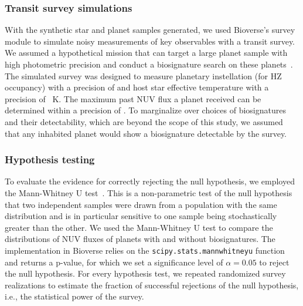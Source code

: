 \documentclass[twocolumn,twocolappendix,linenumbers]{aastex631}
\begin{document}
\subsubsection{Transit survey simulations}
With the synthetic star and planet samples generated, we used Bioverse's survey module to simulate noisy measurements of key observables with a transit survey.
We assumed a hypothetical mission that can target a large planet sample with high photometric precision and conduct a biosignature search on these planets~\citep[e.g.,][]{Apai2019,Apai2022}.
The simulated survey was designed to measure planetary instellation (for \gls{HZ} occupancy) with a precision of  and host star effective temperature with a precision of ~K.
The maximum past \gls{NUV} flux a planet received can be determined within a precision of .
To marginalize over choices of biosignatures and their detectability, which are beyond the scope of this study, we assumed that any inhabited planet would show a biosignature detectable by the survey.


\subsubsection{Hypothesis testing}
To evaluate the evidence for correctly rejecting the null hypothesis, we employed the Mann-Whitney U test~\citep{Mann1947}.
This is a non-parametric test of the null hypothesis that two independent samples were drawn from a population with the same distribution and is in particular sensitive to one sample being stochastically greater than the other.
We used the Mann-Whitney U test to compare the distributions of \gls{NUV} fluxes of planets with and without biosignatures.
The implementation in Bioverse relies on the \texttt{scipy.stats.mannwhitneyu} function~\citep{Virtanen2020} and returns a p-value, for which we set a significance level of $\alpha = 0.05$ to reject the null hypothesis.
For every hypothesis test, we repeated randomized survey realizations to estimate the fraction of successful rejections of the null hypothesis, i.e., the statistical power of the survey.
\end{document}
